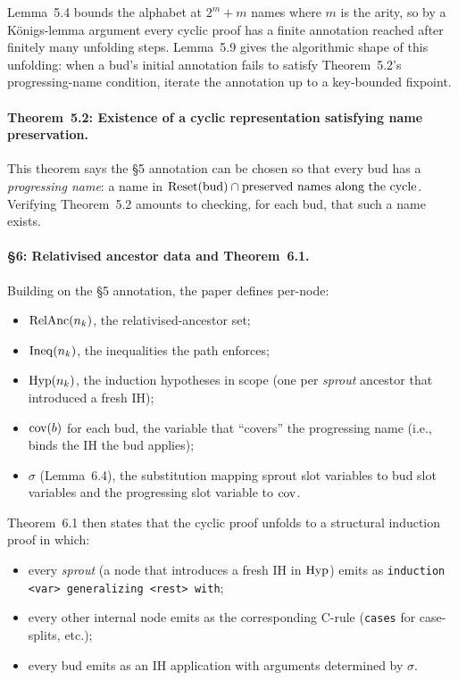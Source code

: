 Lemma~5.4 bounds the alphabet at \(2^m + m\) names where \(m\) is the
arity, so by a Königs-lemma argument every cyclic proof has a finite
annotation reached after finitely many unfolding steps. Lemma~5.9 gives the
algorithmic shape of this unfolding: when a bud's initial annotation fails
to satisfy Theorem~5.2's progressing-name condition, iterate the annotation
up to a key-bounded fixpoint.

\paragraph{Theorem~5.2: Existence of a cyclic representation satisfying name
preservation.}
This theorem says the §5 annotation can be chosen so that every bud has a
\emph{progressing name}: a name in \(\mathrm{Reset}(\text{bud}) \cap \text{preserved
names along the cycle}\). Verifying Theorem~5.2 amounts to checking, for
each bud, that such a name exists.

\paragraph{§6: Relativised ancestor data and Theorem~6.1.}
Building on the §5 annotation, the paper defines per-node:
\begin{itemize}
  \item \(\mathrm{RelAnc}(n_k)\), the relativised-ancestor set;
  \item \(\mathrm{Ineq}(n_k)\), the inequalities the path enforces;
  \item \(\mathrm{Hyp}(n_k)\), the induction hypotheses in scope (one per
    \emph{sprout} ancestor that introduced a fresh IH);
  \item \(\mathrm{cov}(b)\) for each bud, the variable that ``covers'' the
    progressing name (i.e., binds the IH the bud applies);
  \item \(\sigma\) (Lemma~6.4), the substitution mapping sprout slot
    variables to bud slot variables and the progressing slot variable to
    \(\mathrm{cov}\).
\end{itemize}

Theorem~6.1 then states that the cyclic proof unfolds to a structural
induction proof in which:
\begin{itemize}
  \item every \emph{sprout} (a node that introduces a fresh IH in \(\mathrm{Hyp}\))
    emits as \texttt{induction <var> generalizing <rest> with};
  \item every other internal node emits as the corresponding C-rule
    (\texttt{cases} for case-splits, etc.);
  \item every bud emits as an IH application with arguments determined by
    \(\sigma\).
\end{itemize}

